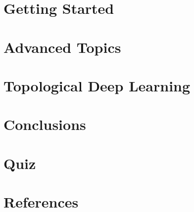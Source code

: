\section[Start]{Getting Started}


\section[Advanced]{Advanced Topics}


\section[TDL]{Topological Deep Learning}


\section[Conclusions]{Conclusions}


\section[QnA]{Quiz}


\section[Refs]{References}

